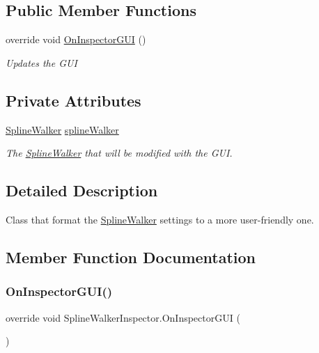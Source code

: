 \subsection*{Public Member Functions}
\begin{DoxyCompactItemize}
\item 
override void \hyperlink{classSplineWalkerInspector_adaf5518940555970bf4d3c49624afb30}{On\+Inspector\+G\+UI} ()
\begin{DoxyCompactList}\small\item\em Updates the G\+UI \end{DoxyCompactList}\end{DoxyCompactItemize}
\subsection*{Private Attributes}
\begin{DoxyCompactItemize}
\item 
\hyperlink{classSplineWalker}{Spline\+Walker} \hyperlink{classSplineWalkerInspector_a97a8fd319093217c295ec9c45f5f1673}{spline\+Walker}
\begin{DoxyCompactList}\small\item\em The \hyperlink{classSplineWalker}{Spline\+Walker} that will be modified with the G\+UI.\end{DoxyCompactList}\end{DoxyCompactItemize}


\subsection{Detailed Description}
Class that format the \hyperlink{classSplineWalker}{Spline\+Walker} settings to a more user-\/friendly one. 



\subsection{Member Function Documentation}
\mbox{\label{classSplineWalkerInspector_adaf5518940555970bf4d3c49624afb30}} 
\subsubsection{\texorpdfstring{On\+Inspector\+G\+U\+I()}{OnInspectorGUI()}}
{\footnotesize\ttfamily override void Spline\+Walker\+Inspector.\+On\+Inspector\+G\+UI (\begin{DoxyParamCaption}{ }\end{DoxyParamCaption})\hspace{0.3cm}{\ttfamily [inline]}}



